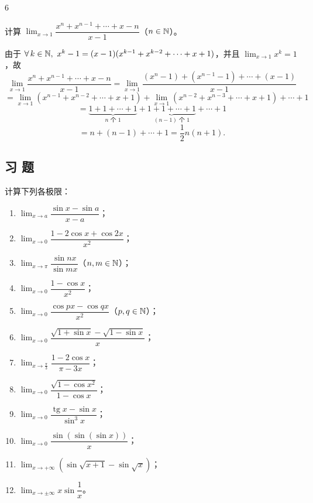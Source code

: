 \begin{sourceexample}{6}

	计算 \(\lim_{x\to1}\dfrac{x^n+x^{n-1}+\cdots+x-n}{x-1}\)（\(n\in\mathbb{N}\)）。

	由于 \(\forall\,k\in\N,\ x^k-1=(x-1)(x^{k-1}+x^{k-2}+\cdots+x+1)\)，并且 \(\lim_{x\to1}x^k=1\)，故
	\[
	\lim_{x\to1}\frac{x^n+x^{n-1}+\cdots+x-n}{x-1}
	=\lim_{x\to1}\frac{(x^n-1)+(x^{n-1}-1)+\cdots+(x-1)}{x-1}
	\]
	\[
	=\lim_{x\to1}(x^{n-1}+x^{n-2}+\cdots+x+1)+\lim_{x\to1}(x^{n-2}+x^{n-3}+\cdots+x+1)+\cdots+1
	\]
	\[
	=\underbrace{1+1+\cdots+1}_{n\text{ 个 }1}+\underbrace{1+1+\cdots+1}_{(n-1)\text{ 个 }1}+\cdots+1
	\]
	\[
	=n+(n-1)+\cdots+1=\frac12n(n+1).
	\]

\end{sourceexample}

\subsection*{习 题}

\begin{exercise}
	\item 计算下列各极限：
	\begin{enumerate}[label=\arabic*)]
		\item \(\lim_{x\to a}\dfrac{\sin x-\sin a}{x-a}\)；
		\item \(\lim_{x\to0}\dfrac{1-2\cos x+\cos2x}{x^2}\)；
		\item \(\lim_{x\to\pi}\dfrac{\sin nx}{\sin mx}\)（\(n,m\in\mathbb{N}\)）；
		\item \(\lim_{x\to0}\dfrac{1-\cos x}{x^2}\)；
		\item \(\lim_{x\to0}\dfrac{\cos px-\cos qx}{x^2}\)（\(p,q\in\mathbb{N}\)）；
		\item \(\lim_{x\to0}\dfrac{\sqrt{1+\sin x}-\sqrt{1-\sin x}}{x}\)；
		\item \(\lim_{x\to\frac\pi3}\dfrac{1-2\cos x}{\pi-3x}\)；
		\item \(\lim_{x\to0}\dfrac{\sqrt{1-\cos x^2}}{1-\cos x}\)；
		\item \(\lim_{x\to0}\dfrac{\operatorname{tg}x-\sin x}{\sin^3x}\)；
		\item \(\lim_{x\to0}\dfrac{\sin(\sin(\sin x))}{x}\)；
		\item \(\lim_{x\to+\infty}(\sin\sqrt{x+1}-\sin\sqrt{x})\)；
		\item \(\lim_{x\to\pm\infty}x\sin\dfrac1x\)。
	\end{enumerate}
\end{exercise}

